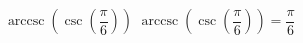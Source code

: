  {$\operatorname{arccsc}\left(\csc\left(\dfrac{\pi}{6}\right) \right)$ }
{ $\operatorname{arccsc}\left(\csc\left(\dfrac{\pi}{6}\right) \right) = \dfrac{\pi}{6}$ }
